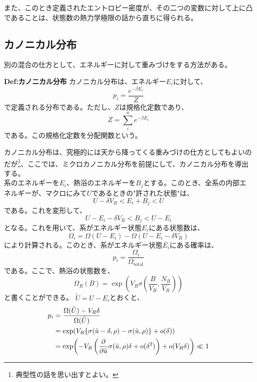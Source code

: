 \documentclass[a4paper,11pt]{jsarticle}
\numberwithin{equation}{section}
\begin{document}
また、このとき定義されたエントロピー密度が、その二つの変数に対して上に凸であることは、状態数の熱力学極限の話から直ちに得られる。\\

\subsection{カノニカル分布}
別の混合の仕方として、エネルギーに対して重みづけをする方法がある。\\
\begin{itembox}[l]{\textbf{Def:カノニカル分布}}
  カノニカル分布は、エネルギー$E_i$に対して、
  \begin{equation}
    p_i = \frac{e^{-\beta E_i}}{Z}
  \end{equation}
  で定義される分布である。ただし、$Z$は規格化定数であり、
  \begin{equation}
    Z = \sum_{i}^{n} e^{-\beta E_i}
  \end{equation}
  である。この規格化定数を分配関数という。

\end{itembox}
カノニカル分布は、究極的には天から降ってくる重みづけの仕方としてもよいのだが\footnote{典型性の話を思い出すとよい。}、ここでは、ミクロカノニカル分布を前提にして、カノニカル分布を導出する。\\
系のエネルギーを$E_i$、熱浴のエネルギーを$B_j$とする。このとき、全系の内部エネルギーが、マクロにみて$U$であるときの"許された状態"は、
\begin{equation}
  U - \delta V_{R} < E_i + B_j < U
\end{equation}
である。これを変形して、
\begin{equation}
  U - E_i - \delta V_{R} < B_j < U - E_i
\end{equation}
となる。これを用いて、系がエネルギー状態$E_i$にある状態数は、
\begin{equation}
  \Omega_{i} = \Omega(U-E_i) - \Omega(U-E_i-\delta V_{R})
\end{equation}
により計算される。このとき、系がエネルギー状態$E_i$にある確率は、
\begin{equation}
  p_i = \frac{\Omega_i}{\Omega_{\text{total}}}
\end{equation}
である。ここで、熱浴の状態数を、
\begin{equation}
  \Omega_{R} (B) = \exp(V_{R}\sigma \left(\frac{B}{V_{R}},\frac{N_{R}}{V_{R}}\right))
\end{equation}
と書くことができる。
$\tilde{U} = U - E_i$とおくと、
\begin{align}
  p_i &= \frac{\Omega(\tilde{U}) - V_{R}\delta}{\Omega(\tilde{U})} \\
  &= \exp(V_{R}\{\sigma(\tilde{u}-\delta ,\rho) - \sigma(\tilde{u},\rho)\} + o(\delta))\\
  &= \exp(-V_{R}\left(\pdv{\tilde{u}}\sigma(\tilde{u},\rho)\delta + o(\delta^2)\right)+ o(V_R\delta))\ll 1
\end{align}
\end{document}
